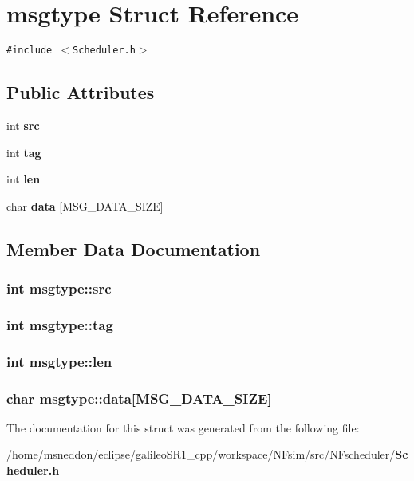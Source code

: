 \section{msgtype Struct Reference}
\label{structmsgtype}
{\tt \#include $<$Scheduler.h$>$}

\subsection*{Public Attributes}
\begin{CompactItemize}
\item 
int {\bf src}
\item 
int {\bf tag}
\item 
int {\bf len}
\item 
char {\bf data} [MSG\_\-DATA\_\-SIZE]
\end{CompactItemize}


\subsection{Member Data Documentation}
\subsubsection{\setlength{\rightskip}{0pt plus 5cm}int {\bf msgtype::src}}\label{structmsgtype_4b656660ee0164c9b549aaa46625b65a}


\subsubsection{\setlength{\rightskip}{0pt plus 5cm}int {\bf msgtype::tag}}\label{structmsgtype_2df7fc179d6e3b37e7e11bfc6e24c3a0}


\subsubsection{\setlength{\rightskip}{0pt plus 5cm}int {\bf msgtype::len}}\label{structmsgtype_569c03e4fc5da63dc12c8a307fbbf6ac}


\subsubsection{\setlength{\rightskip}{0pt plus 5cm}char {\bf msgtype::data}[MSG\_\-DATA\_\-SIZE]}\label{structmsgtype_5267931f3097fc678dfa680219da9747}




The documentation for this struct was generated from the following file:\begin{CompactItemize}
\item 
/home/msneddon/eclipse/galileoSR1\_\-cpp/workspace/NFsim/src/NFscheduler/{\bf Scheduler.h}\end{CompactItemize}
